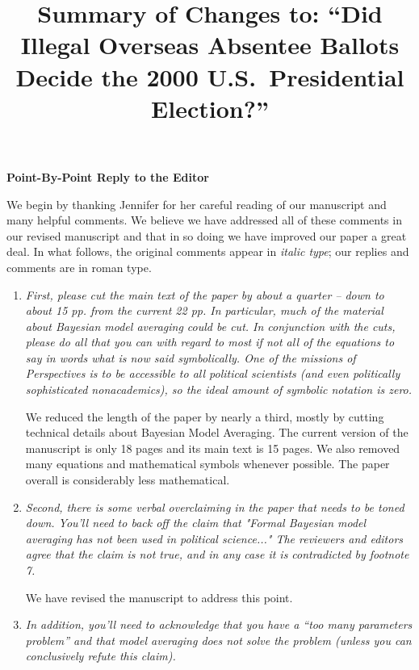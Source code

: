 \documentclass[11pt]{article}
\title{Summary of Changes to: ``Did Illegal Overseas Absentee Ballots
  Decide the 2000 U.S.\ Presidential Election?''}
\begin{document}
\maketitle

\begin{center}
  {\bf \Large Point-By-Point Reply to the Editor}
\end{center}

We begin by thanking Jennifer for her careful reading of our
manuscript and many helpful comments. We believe we have addressed all
of these comments in our revised manuscript and that in so doing we
have improved our paper a great deal.  In what follows, the original
comments appear in \emph{italic type}; our replies and comments are in
roman type.


\begin{enumerate}
\item {\it First, please cut the main text of the paper by about a
    quarter -- down to about 15 pp. from the current 22 pp.  In
    particular, much of the material about Bayesian model averaging
    could be cut. In conjunction with the cuts, please do all that you
    can with regard to most if not all of the equations to say in
    words what is now said symbolically. One of the missions of
    Perspectives is to be accessible to all political scientists (and
    even politically sophisticated nonacademics), so the ideal amount
    of symbolic notation is zero.}
  
  We reduced the length of the paper by nearly a third, mostly by
  cutting technical details about Bayesian Model Averaging.  The
  current version of the manuscript is only 18 pages and its main text
  is 15 pages.  We also removed many equations and mathematical
  symbols whenever possible.  The paper overall is considerably less
  mathematical.
  
\item {\it Second, there is some verbal overclaiming in the paper that
    needs to be toned down.  You'll need to back off the claim that
    "Formal Bayesian model averaging has not been used in political
    science..."  The reviewers and editors agree that the claim is not
    true, and in any case it is contradicted by footnote 7.}
  
  We have revised the manuscript to address this point.
  
\item {\it In addition, you'll need to acknowledge that you have a
    ``too many parameters problem'' and that model averaging does not
    solve the problem (unless you can conclusively refute this
    claim).}
  

\end{enumerate}
\end{document}
